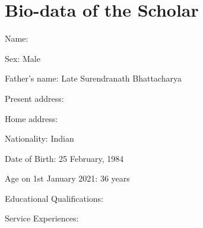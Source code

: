 \chapter{Bio-data of the Scholar} \label{appendix:biodata}

    Name: \authorname
    
    Sex: Male
    
    Father’s name: Late Surendranath Bhattacharya
    
    Present address: 
    
    Home address:
    
    Nationality: Indian
    
    Date of Birth: 25 February, 1984
    
    Age on 1st January 2021: 36 years
    
    Educational Qualifications:
    
    Service Experiences: 